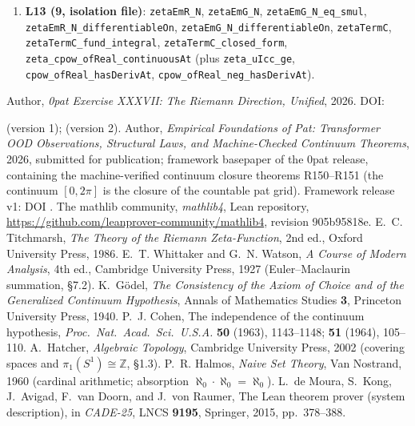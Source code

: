 \documentclass{article}
\begin{document}
{\begin{sloppypar}
\begin{enumerate}
\texttt{zeta\_line\_two\_bounded}, \texttt{Gamma\_one\_add\_it\_norm\_le\_one},
\texttt{zeta\_ne\_zero\_on\_bottom\_edge}, \texttt{zeta\_im\_zero\_on\_real},
\texttt{zeta\_neg\_one\_re\_neg}, \texttt{bottom\_edge\_arg\_jump},
\texttt{zeta\_partial\_sum\_lt\_integral\_bound}.
\item \textbf{L13 (9, isolation file)}: \texttt{zetaEmR\_N},
\texttt{zetaEmG\_N}, \texttt{zetaEmG\_N\_eq\_smul},
\texttt{zetaEmR\_N\_differentiableOn}, \texttt{zetaEmG\_N\_differentiableOn},
\texttt{zetaTermC}, \texttt{zetaTermC\_fund\_integral},
\texttt{zetaTermC\_closed\_form}, \texttt{zeta\_cpow\_ofReal\_continuousAt}
(plus \texttt{zeta\_uIcc\_ge}, \texttt{cpow\_ofReal\_hasDerivAt},
\texttt{cpow\_ofReal\_neg\_hasDerivAt}).
\end{enumerate}
\end{sloppypar}}

\begin{thebibliography}{9}
Author, \emph{0pat Exercise XXXVII: The Riemann Direction, Unified},
2026. DOI:

(version 1);  (version 2).
Author, \emph{Empirical Foundations of Pat: Transformer OOD Observations,
Structural Laws, and Machine-Checked Continuum Theorems}, 2026, submitted
for publication; framework basepaper of the 0pat release, containing the
machine-verified continuum closure theorems R150--R151 (the continuum
$[0,2\pi]$ is the closure of the countable pat grid). Framework release
v1: DOI
.
The mathlib community, \emph{mathlib4}, Lean repository,
\url{https://github.com/leanprover-community/mathlib4}, revision 905b95818e.
E.~C. Titchmarsh, \emph{The Theory of the Riemann Zeta-Function}, 2nd ed.,
Oxford University Press, 1986.
E.~T. Whittaker and G.~N. Watson, \emph{A Course of Modern Analysis}, 4th ed.,
Cambridge University Press, 1927 (Euler--Maclaurin summation, \S7.2).
K.~G\"odel, \emph{The Consistency of the Axiom of Choice and of the
Generalized Continuum Hypothesis}, Annals of Mathematics Studies \textbf{3},
Princeton University Press, 1940.
P.~J. Cohen, The independence of the continuum hypothesis,
\emph{Proc.\ Nat.\ Acad.\ Sci.\ U.S.A.} \textbf{50} (1963), 1143--1148;
\textbf{51} (1964), 105--110.
A.~Hatcher, \emph{Algebraic Topology}, Cambridge University Press, 2002
(covering spaces and $\pi_1(S^1)\cong\mathbb Z$, \S1.3).
P.~R. Halmos, \emph{Naive Set Theory}, Van Nostrand, 1960
(cardinal arithmetic; absorption $\aleph_0\cdot\aleph_0=\aleph_0$).
L.~de Moura, S.~Kong, J.~Avigad, F.~van Doorn, and J.~von Raumer,
The Lean theorem prover (system description), in \emph{CADE-25},
LNCS \textbf{9195}, Springer, 2015, pp.~378--388.
\end{thebibliography}
\end{document}
